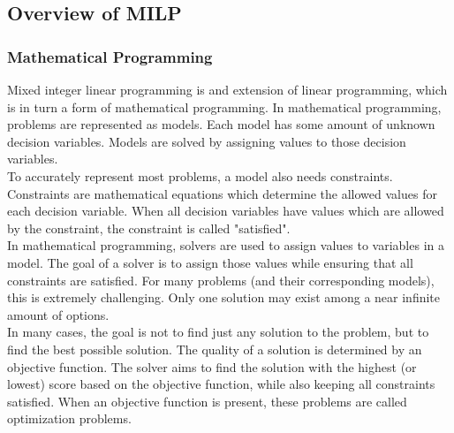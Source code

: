\subsection{Overview of MILP}
\label{subsec:milp-overview}
\subsubsection{Mathematical Programming}
Mixed integer linear programming is and extension of linear programming, which is in turn a form of mathematical programming. In mathematical programming, problems are represented as models. Each model has some amount of unknown decision variables. Models are solved by assigning values to those decision variables. \\
To accurately represent most problems, a model also needs constraints. Constraints are mathematical equations which determine the allowed values for each decision variable. When all decision variables have values which are allowed by the constraint, the constraint is called "satisfied". \\
In mathematical programming, solvers are used to assign values to variables in a model. The goal of a solver is to assign those values while ensuring that all constraints are satisfied. For many problems (and their corresponding models), this is extremely challenging. Only one solution may exist among a near infinite amount of options. \\
In many cases, the goal is not to find just any solution to the problem, but to find the best possible solution. The quality of a solution is determined by an objective function. The solver aims to find the solution with the highest (or lowest) score based on the objective function, while also keeping all constraints satisfied. When an objective function is present, these problems are called optimization problems. \\
